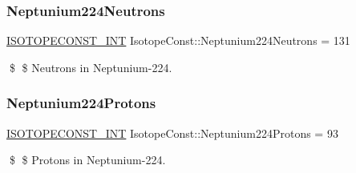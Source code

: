 \subsubsection{\texorpdfstring{Neptunium224\+Neutrons}{Neptunium224Neutrons}}
{\footnotesize\ttfamily \mbox{\hyperlink{group___isotope_const-_macros_ga5f18360b3e99483a35c32d789e62621c}{I\+S\+O\+T\+O\+P\+E\+C\+O\+N\+S\+T\+\_\+\+I\+NT}} Isotope\+Const\+::\+Neptunium224\+Neutrons = 131}

\$ \$ Neutrons in Neptunium-\/224. \mbox{\label{group___isotope_const-_neptunium-_np224_gab781327f2b131e281366277dc206ba89}} 
\subsubsection{\texorpdfstring{Neptunium224\+Protons}{Neptunium224Protons}}
{\footnotesize\ttfamily \mbox{\hyperlink{group___isotope_const-_macros_ga5f18360b3e99483a35c32d789e62621c}{I\+S\+O\+T\+O\+P\+E\+C\+O\+N\+S\+T\+\_\+\+I\+NT}} Isotope\+Const\+::\+Neptunium224\+Protons = 93}

\$ \$ Protons in Neptunium-\/224. 